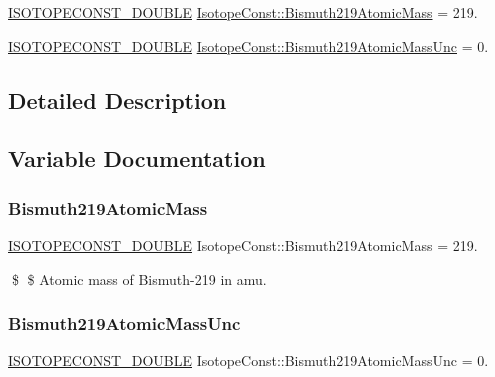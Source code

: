 \begin{DoxyCompactItemize}
\item 
\mbox{\hyperlink{group___isotope_const-_macros_ga8f45a7272ce02c0b4c65c44636ed719a}{I\+S\+O\+T\+O\+P\+E\+C\+O\+N\+S\+T\+\_\+\+D\+O\+U\+B\+LE}} \mbox{\hyperlink{group___isotope_const-_bismuth-_bi219_gaaed7d77e1010ca755a8fbb393c30a84f}{Isotope\+Const\+::\+Bismuth219\+Atomic\+Mass}} = 219.
\item 
\mbox{\hyperlink{group___isotope_const-_macros_ga8f45a7272ce02c0b4c65c44636ed719a}{I\+S\+O\+T\+O\+P\+E\+C\+O\+N\+S\+T\+\_\+\+D\+O\+U\+B\+LE}} \mbox{\hyperlink{group___isotope_const-_bismuth-_bi219_ga101baeeaae10ed75832d65c1c13ea510}{Isotope\+Const\+::\+Bismuth219\+Atomic\+Mass\+Unc}} = 0.
\end{DoxyCompactItemize}


\subsection{Detailed Description}


\subsection{Variable Documentation}
\mbox{\label{group___isotope_const-_bismuth-_bi219_gaaed7d77e1010ca755a8fbb393c30a84f}} 
\subsubsection{\texorpdfstring{Bismuth219\+Atomic\+Mass}{Bismuth219AtomicMass}}
{\footnotesize\ttfamily \mbox{\hyperlink{group___isotope_const-_macros_ga8f45a7272ce02c0b4c65c44636ed719a}{I\+S\+O\+T\+O\+P\+E\+C\+O\+N\+S\+T\+\_\+\+D\+O\+U\+B\+LE}} Isotope\+Const\+::\+Bismuth219\+Atomic\+Mass = 219.}

\$ \$ Atomic mass of Bismuth-\/219 in amu. \mbox{\label{group___isotope_const-_bismuth-_bi219_ga101baeeaae10ed75832d65c1c13ea510}} 
\subsubsection{\texorpdfstring{Bismuth219\+Atomic\+Mass\+Unc}{Bismuth219AtomicMassUnc}}
{\footnotesize\ttfamily \mbox{\hyperlink{group___isotope_const-_macros_ga8f45a7272ce02c0b4c65c44636ed719a}{I\+S\+O\+T\+O\+P\+E\+C\+O\+N\+S\+T\+\_\+\+D\+O\+U\+B\+LE}} Isotope\+Const\+::\+Bismuth219\+Atomic\+Mass\+Unc = 0.}

